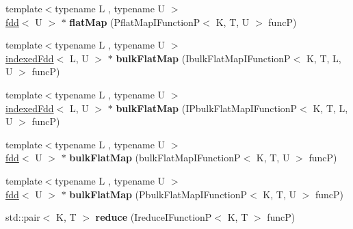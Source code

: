 \begin{DoxyCompactItemize}
\item 
\hypertarget{classfaster_1_1indexedFdd_aa97f249971caca71c70a03bb170b3829}{}{\footnotesize template$<$typename L , typename U $>$ }\\\hyperlink{classfaster_1_1fdd}{fdd}$<$ U $>$ $\ast$ {\bfseries flat\+Map} (Pflat\+Map\+I\+Function\+P$<$ K, T, U $>$ func\+P)\label{classfaster_1_1indexedFdd_aa97f249971caca71c70a03bb170b3829}

\item 
\hypertarget{classfaster_1_1indexedFdd_a3912bcd68abe5012c0573f1b2df4c5ad}{}{\footnotesize template$<$typename L , typename U $>$ }\\\hyperlink{classfaster_1_1indexedFdd}{indexed\+Fdd}$<$ L, U $>$ $\ast$ {\bfseries bulk\+Flat\+Map} (Ibulk\+Flat\+Map\+I\+Function\+P$<$ K, T, L, U $>$ func\+P)\label{classfaster_1_1indexedFdd_a3912bcd68abe5012c0573f1b2df4c5ad}

\item 
\hypertarget{classfaster_1_1indexedFdd_a1c49efc7eac095aaefb1446f31147536}{}{\footnotesize template$<$typename L , typename U $>$ }\\\hyperlink{classfaster_1_1indexedFdd}{indexed\+Fdd}$<$ L, U $>$ $\ast$ {\bfseries bulk\+Flat\+Map} (I\+Pbulk\+Flat\+Map\+I\+Function\+P$<$ K, T, L, U $>$ func\+P)\label{classfaster_1_1indexedFdd_a1c49efc7eac095aaefb1446f31147536}

\item 
\hypertarget{classfaster_1_1indexedFdd_aa06dfd667524b0ec9e10edf666414715}{}{\footnotesize template$<$typename L , typename U $>$ }\\\hyperlink{classfaster_1_1fdd}{fdd}$<$ U $>$ $\ast$ {\bfseries bulk\+Flat\+Map} (bulk\+Flat\+Map\+I\+Function\+P$<$ K, T, U $>$ func\+P)\label{classfaster_1_1indexedFdd_aa06dfd667524b0ec9e10edf666414715}

\item 
\hypertarget{classfaster_1_1indexedFdd_a811004fa92fc8685402fd10584b7863a}{}{\footnotesize template$<$typename L , typename U $>$ }\\\hyperlink{classfaster_1_1fdd}{fdd}$<$ U $>$ $\ast$ {\bfseries bulk\+Flat\+Map} (Pbulk\+Flat\+Map\+I\+Function\+P$<$ K, T, U $>$ func\+P)\label{classfaster_1_1indexedFdd_a811004fa92fc8685402fd10584b7863a}

\item 
\hypertarget{classfaster_1_1indexedFdd_a1b2c52816eb473decdd3e06c70db255b}{}std\+::pair$<$ K, T $>$ {\bfseries reduce} (Ireduce\+I\+Function\+P$<$ K, T $>$ func\+P)\label{classfaster_1_1indexedFdd_a1b2c52816eb473decdd3e06c70db255b}


\end{DoxyCompactItemize}
